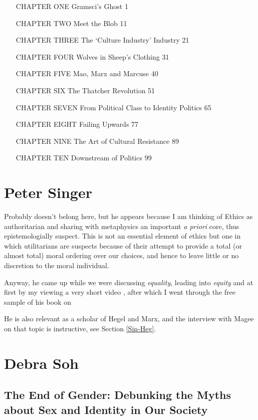 \documentclass[10pt,titlepage]{book}
\begin{document}
\begin{itemize}
\item[CHAPTER ONE] Gramsci’s Ghost 1
\item[CHAPTER TWO] Meet the Blob 11
\item[CHAPTER THREE] The ‘Culture Industry’ Industry 21
\item[CHAPTER FOUR] Wolves in Sheep’s Clothing 31
\item[CHAPTER FIVE] Mao, Marx and Marcuse 40
\item[CHAPTER SIX] The Thatcher Revolution 51
\item[CHAPTER SEVEN] From Political Class to Identity Politics 65
\item[CHAPTER EIGHT] Failing Upwards 77
\item[CHAPTER NINE] The Art of Cultural Resistance 89
\item[CHAPTER TEN] Downstream of Politics 99
\end{itemize}

\section{Peter Singer}\label{SingerPeter}

Probably doesn't belong here, but he appears because I am thinking of Ethics as authoritarian and sharing with metaphysics an important \emph{a priori} core, thus epistemologially suspect.
This is not an essential element of ethics but one in which utilitarians are suspects because of their attempt to provide a total (or almost total) moral ordering over our choices, and hence to leave little or no discretion to the moral individual.

Anyway, he came up while we were discussing \emph{equality}, leading into \emph{equity} and at first by my viewing a very short video \cite{singer-eqvid}, after which I went through the free sample of his book on

He is also relevant as a scholar of Hegel and Marx, and the interview with Magee on that topic \cite{magee-singer} is instructive, see Section \ref{Sin-Heg}.

\section{Debra Soh}\label{SohDebra}

\subsection{The End of Gender: Debunking the Myths about
Sex and Identity in Our Society \cite{soh-end}}
\end{document}
